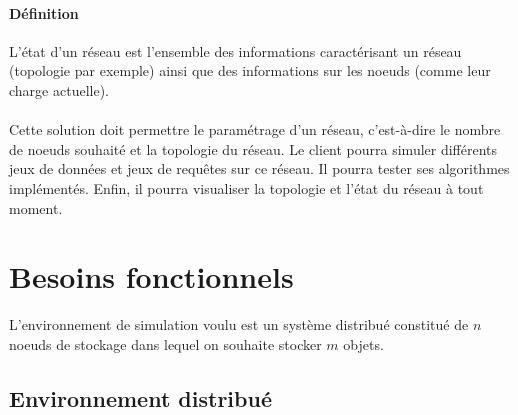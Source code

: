 \documentclass[12pt]{article}
\begin{document}
\paragraph{Définition} L'état d'un réseau est l'ensemble des informations caractérisant un réseau (topologie par exemple) ainsi que des informations sur les noeuds (comme leur charge actuelle).

\paragraph{}Cette solution doit permettre le paramétrage d'un réseau, c'est-à-dire le nombre de noeuds souhaité et la topologie du réseau.
Le client pourra simuler différents jeux de données et jeux de requêtes sur ce réseau.
Il pourra tester ses algorithmes implémentés.
Enfin, il pourra visualiser la topologie et l'état du réseau à tout moment.

\newpage

\section{Besoins fonctionnels}

L'environnement de simulation voulu est un système distribué constitué de $n$ noeuds de stockage dans lequel on souhaite stocker $m$ objets.

\subsection{Environnement distribué}

	
\end{document}
